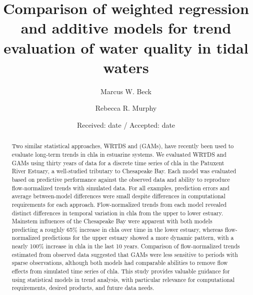 \documentclass{svjour3}\usepackage[]{graphicx}\usepackage[]{color}
\begin{document}
\title{Comparison of weighted regression and additive models for trend evaluation of water quality in tidal waters
}


\author{Marcus W. Beck       \and
        Rebecca R. Murphy
}


\date{Received: date / Accepted: date}

\maketitle

\begin{abstract}
Two similar statistical approaches, \ac{WRTDS} and  (\acp{GAM}), have recently been used to evaluate long-term trends in \ac{chla} in estuarine systems. We evaluated \ac{WRTDS} and \acp{GAM} using thirty years of data for a discrete time series of \ac{chla} in the Patuxent River Estuary, a well-studied tributary to Chesapeake Bay.  Each model was evaluated based on predictive performance against the observed data and ability to reproduce flow-normalized trends with simulated data.  For all examples, prediction errors and average between-model differences were small despite differences in computational requirements for each approach.  Flow-normalized trends from each model revealed distinct differences in temporal variation in \ac{chla} from the upper to lower estuary.  Mainstem influences of the Chesapeake Bay were apparent with both models predicting a roughly 65\% increase in \ac{chla} over time in the lower estuary, whereas flow-normalized predictions for the upper estuary showed a more dynamic pattern, with a nearly 100\% increase in \ac{chla} in the last 10 years.  Comparison of flow-normalized trends estimated from observed data suggested that \acp{GAM} were less sensitive to periods with sparse observations, although both models had comparable abilities to remove flow effects from simulated time series of \ac{chla}.  This study provides valuable guidance for using statistical models in trend analysis, with particular relevance for computational requirements, desired products, and future data needs.
\end{abstract}
\end{document}
